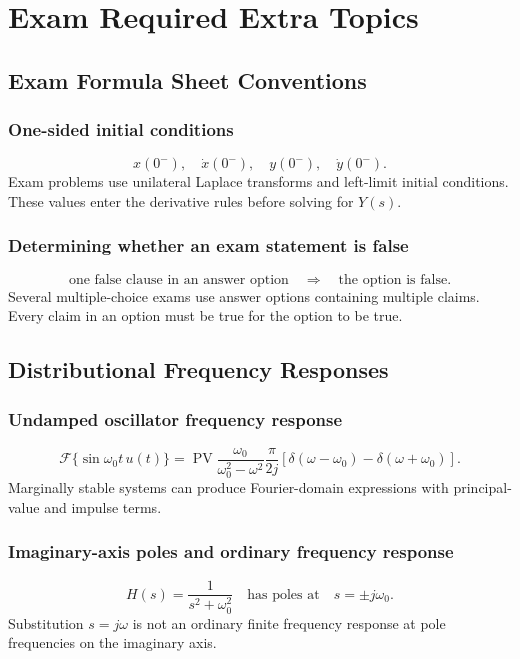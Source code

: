 \section{Exam Required Extra Topics}

\subsection{Exam Formula Sheet Conventions}

\subsubsection{One-sided initial conditions}
\[
x(0^-),\quad \dot{x}(0^-),\quad y(0^-),\quad \dot{y}(0^-).
\]
Exam problems use unilateral Laplace transforms and left-limit initial conditions. These values enter the derivative rules before solving for \(Y(s)\).

\subsubsection{Determining whether an exam statement is false}
\[
\text{one false clause in an answer option} \quad \Rightarrow \quad \text{the option is false}.
\]
Several multiple-choice exams use answer options containing multiple claims. Every claim in an option must be true for the option to be true.

\subsection{Distributional Frequency Responses}

\subsubsection{Undamped oscillator frequency response}
\[
\mathcal{F}\{\sin \omega_0t\,u(t)\}
=\operatorname{PV}\frac{\omega_0}{\omega_0^2-\omega^2}
\frac{\pi}{2j}\left[\delta(\omega-\omega_0)-\delta(\omega+\omega_0)\right].
\]
Marginally stable systems can produce Fourier-domain expressions with principal-value and impulse terms. %

\subsubsection{Imaginary-axis poles and ordinary frequency response}
\[
H(s)=\frac{1}{s^2+\omega_0^2}
\quad \text{has poles at}\quad s=\pm j\omega_0.
\]
Substitution \(s=j\omega\) is not an ordinary finite frequency response at pole frequencies on the imaginary axis.
